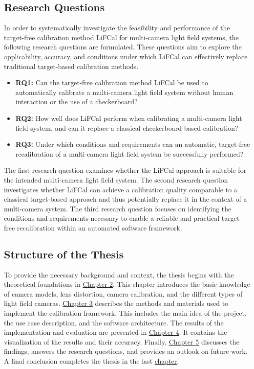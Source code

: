 \documentclass[12pt]{scrartcl}
\begin{document}
\subsection{Research Questions}

In order to systematically investigate the feasibility and performance of the target-free calibration method LiFCal for multi-camera light field systems, the following research questions are formulated. These questions aim to explore the applicability, accuracy, and conditions under which LiFCal can effectively replace traditional target-based calibration methods.

\begin{itemize}
  \item \textbf{RQ1:} Can the target-free calibration method LiFCal be used to automatically calibrate a multi-camera light field system without human interaction or the use of a checkerboard?

  \item \textbf{RQ2:} How well does LiFCal perform when calibrating a multi-camera light field system, and can it replace a classical checkerboard-based calibration?

  \item \textbf{RQ3:} Under which conditions and requirements can an automatic, target-free recalibration of a multi-camera light field system be successfully performed?
\end{itemize}

The first research question examines whether the LiFCal approach is suitable for the intended multi-camera light field system. The second research question investigates whether LiFCal can achieve a calibration quality comparable to a classical target-based approach and thus potentially replace it in the context of a multi-camera system. The third research question focuses on identifying the conditions and requirements necessary to enable a reliable and practical target-free recalibration within an automated software framework.

\subsection{Structure of the Thesis}

To provide the necessary background and context, the thesis begins with the theoretical foundations in \hyperref[Chapter 2]{Chapter 2}. This chapter introduces the basic knowledge of camera models, lens distortion, camera calibration, and the different types of light field cameras. \hyperref[Chapter 3]{Chapter 3} describes the methods and materials used to implement the calibration framework. This includes the main idea of the project, the use case description, and the software architecture. The results of the implementation and evaluation are presented in \hyperref[Chapter 4]{Chapter 4}. It contains the visualization of the results and their accuracy. Finally, \hyperref[Chapter 5]{Chapter 5} discusses the findings, answers the research questions, and provides an outlook on future work. A final conclusion completes the thesis in the last \hyperref[Chapter 6]{chapter}.
\end{document}
